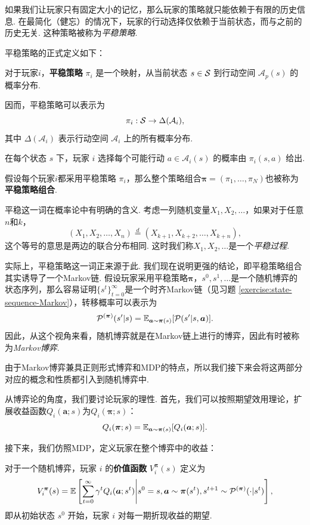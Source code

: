 如果我们让玩家只有固定大小的记忆，那么玩家的策略就只能依赖于有限的历史信息. 在最简化（健忘）的情况下，玩家的行动选择仅依赖于当前状态，而与之前的历史无关. 这种策略被称为\textit{平稳策略}.

平稳策略的正式定义如下：

\begin{definition}[平稳策略]
    对于玩家$i$，\textbf{平稳策略} $\pi_i$ 是一个映射，从当前状态 $s \in \mathcal S$ 到行动空间 $\mathcal{A}_p(s)$ 的概率分布. 
    
    因而，平稳策略可以表示为 
    \[\pi_i : \mathcal S \rightarrow \Delta(\mathcal{A}_i),\]
    其中 $\Delta(\mathcal{A}_i)$ 表示行动空间 $\mathcal{A}_i$ 上的所有概率分布. 
    
    在每个状态 $s$ 下，玩家 $i$ 选择每个可能行动 $a \in \mathcal{A}_i(s)$ 的概率由 $\pi_i(s,a)$ 给出. 
    
    假设每个玩家$i$都采用平稳策略 $\pi_i$，那么整个策略组合$\boldsymbol \pi=(\pi_1,\dots, \pi_N)$也被称为\textbf{平稳策略组合}.
\end{definition}

平稳这一词在概率论中有明确的含义. 考虑一列随机变量$X_1,X_2,\dots$，如果对于任意$n$和$k$，
\[(X_1,X_2,\dots,X_n)\stackrel{d}{=} (X_{k+1},X_{k+2},\dots,X_{k+n}),\]
这个等号的意思是两边的联合分布相同. 这时我们称$X_1,X_2,\dots$是一个\textit{平稳过程}.

实际上，平稳策略这一词正来源于此. 我们现在说明更强的结论，即平稳策略组合其实诱导了一个Markov链. 假设玩家采用平稳策略$\boldsymbol \pi$，$s^0,s^1,\dots$是一个随机博弈的状态序列，那么容易证明$\{s^t\}_{t=0}^{\infty}$是一个时齐Markov链（见习题 \ref{exercise:state-sequence-Markov}），转移概率可以表示为
\[\mathcal P^{(\boldsymbol \pi)}(s'|s)=\mathbb{E}_{\boldsymbol a\sim \boldsymbol \pi(s)}[\mathcal P(s'|s,\boldsymbol a)].\]
因此，从这个视角来看，随机博弈就是在Markov链上进行的博弈，因此有时被称为\textit{Markov博弈}.

由于Markov博弈兼具正则形式博弈和MDP的特点，所以我们接下来会将这两部分对应的概念和性质都引入到随机博弈中.

从博弈论的角度，我们要讨论玩家的理性. 首先，我们可以按照期望效用理论，扩展收益函数$Q_i(\boldsymbol a;s)$为$Q_i(\boldsymbol \pi;s)$：
\[Q_i(\boldsymbol \pi;s)=\mathbb{E}_{\boldsymbol a\sim \boldsymbol \pi(s)}[Q_i(\boldsymbol a;s)].\]

接下来，我们仿照MDP，定义玩家在整个博弈中的收益：

\begin{definition}[价值函数]
    对于一个随机博弈，玩家 $i$ 的\textbf{价值函数} $V_i^{\boldsymbol \pi}(s)$ 定义为
    \[V_i^{\boldsymbol \pi}(s) = \mathbb{E}\left[\sum_{t=0}^{\infty} \gamma^t Q_i(\boldsymbol a; s^t)\middle| s^0=s, \boldsymbol a\sim \boldsymbol \pi(s^t), s^{t+1}\sim \mathcal P^{(\boldsymbol \pi)}(\cdot|s^t)\right],\]
    即从初始状态 $s^0$ 开始，玩家 $i$ 对每一期折现收益的期望.
\end{definition}

